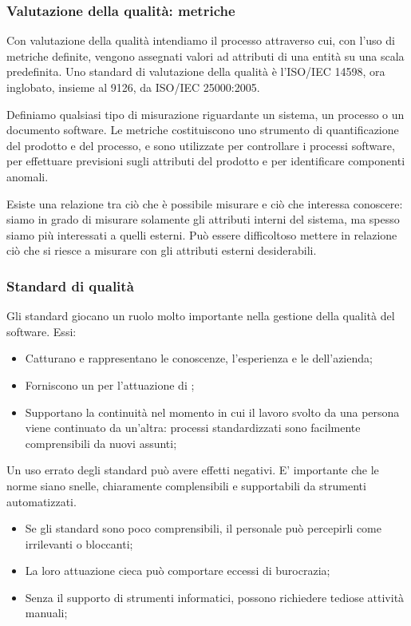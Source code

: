 \subsubsection{Valutazione della qualità: metriche}
Con valutazione della qualità intendiamo il processo attraverso cui, con l'uso di metriche definite, vengono assegnati valori ad attributi di una entità su una scala predefinita. Uno standard di valutazione della qualità è l'ISO/IEC 14598, ora inglobato, insieme al 9126, da ISO/IEC 25000:2005.

Definiamo  qualsiasi tipo di misurazione riguardante un sistema, un processo o un documento software. Le metriche costituiscono uno strumento di quantificazione del prodotto e del processo, e sono utilizzate per controllare i processi software, per effettuare previsioni sugli attributi del prodotto e per identificare componenti anomali.

Esiste una relazione tra ciò che è possibile misurare e ciò che interessa conoscere: siamo in grado di misurare solamente gli attributi interni del sistema, ma spesso siamo più interessati a quelli esterni. Può essere difficoltoso mettere in relazione ciò che si riesce a misurare con gli attributi esterni desiderabili.


\subsubsection{Standard di qualità}
Gli standard giocano un ruolo molto importante nella gestione della qualità del software. Essi:
\begin{itemize}
	\item Catturano e rappresentano le conoscenze, l'esperienza e le  dell'azienda;
	\item Forniscono un  per l'attuazione di ;
	\item Supportano la continuità nel momento in cui il lavoro svolto da una persona viene continuato da un'altra: processi standardizzati sono facilmente comprensibili da nuovi assunti;
\end{itemize}

Un uso errato degli standard può avere effetti negativi. E' importante che le norme siano snelle, chiaramente complensibili e supportabili da strumenti automatizzati.
\begin{itemize}
	\item Se gli standard sono poco comprensibili, il personale può percepirli come irrilevanti o bloccanti;
	\item La loro attuazione cieca può comportare eccessi di burocrazia;
	\item Senza il supporto di strumenti informatici, possono richiedere tediose attività manuali;
\end{itemize}


